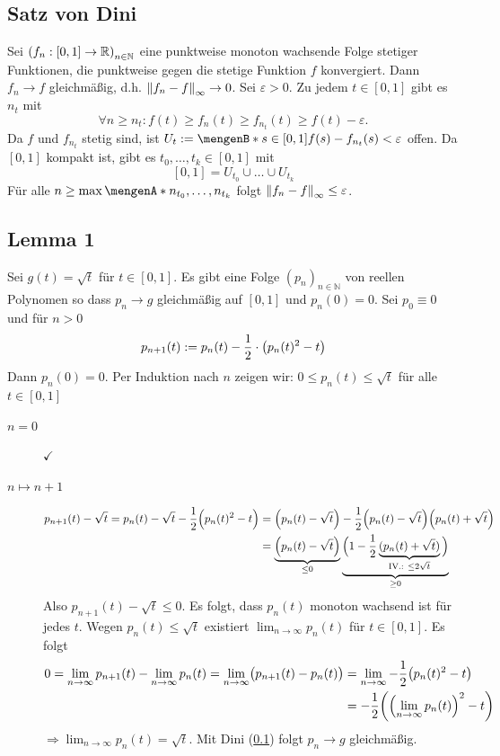 \subsection{Satz von Dini} %
\label{sub:64}
Sei $\enbrace*{f_n : [0,1] \to \mathds{R}}_{n \in \mathds{N}}$ eine punktweise monoton wachsende Folge stetiger Funktionen, die punktweise gegen die stetige Funktion $f$
konvergiert. Dann $f_n \to f$ gleichmäßig, d.h. $\norm[\infty]{f_n -f} \to 0 $.
Sei $\varepsilon >0$. Zu jedem $t \in [0,1]$ gibt es $n_t$ mit 
\[
	\forall n\ge n_t : f(t) \ge f_n(t) \ge f_{n_t}(t) \ge f(t) - \varepsilon. 
\]
Da $f$ und $f_{n_t}$ stetig sind,
ist $U_t := \set[{s \in [0,1]}]{f(s) - f_{n_t}(s) < \varepsilon} $ offen. Da $[0,1]$ kompakt ist, gibt es $t_0, \ldots , t_k \in [0,1]$ mit 
\[
	[0,1] = U_{t_0} \cup \ldots \cup U_{t_k}
\]
Für alle $n \ge \max \set{n_{t_0}, \ldots , n_{t_k}} $ folgt
\(
	\norm[\infty]{f_n - f} \le \varepsilon
\). \bewende 

\subsection[Lemma 1: Folge reeller Polynome, die gleichmäßig gegen Wurzelfunktion konvergiert]{Lemma 1} %
\label{sub:65}
Sei $g(t) = \sqrt{t}$ für $t \in [0,1]$. Es gibt eine Folge $(p_n)_{n \in \mathds{N}}$ von reellen Polynomen so dass $p_n \to g$ gleichmäßig auf $[0,1]$ und $p_n(0)=0$.
Sei $p_0 \equiv 0$ und für $n > 0$
\[
	p_{n+1} (t) := p_n(t) - \frac{1}{2} \cdot \enbrace[\big]{p_n(t)^2 - t} 
\]
Dann $p_n(0)=0$. Per Induktion nach $n$ zeigen wir: $0 \le p_n(t) \le \sqrt{t}$ für alle $t \in [0,1]$
\begin{description}
	\item[$n=0$] $\checkmark$ 
	\item[$n \mapsto n+1$] \begin{align*}
		p_{n+1}(t) - \sqrt{t} = p_n(t) - \sqrt{t} - \frac{1}{2} \enbrace[\Big]{p_n(t)^2 -t} &= \enbrace*{p_n(t) - \sqrt{t} }- \frac{1}{2} \enbrace*{p_n(t)- \sqrt{t}} 
		\enbrace*{p_n(t) + \sqrt{t}}        \\
		&=\underbrace{\enbrace*{p_n(t) - \sqrt{t}  } }_{\le 0} \underbrace{\Big( 1- \frac{1}{2}\underbrace{(p_n(t) + \sqrt{t}  )}_{\text{IV.: }\le 2 \sqrt{t}  } \Big)}_{\ge 0} 
	\end{align*}
	Also $p_{n+1}(t)- \sqrt{t} \le 0$. Es folgt, dass $p_n(t)$ monoton wachsend ist für jedes $t$. Wegen $p_n(t) \le \sqrt{t}$ existiert $\lim_{ n \to \infty} p_n(t)$
	für $t \in [0,1]$. Es folgt 
	\begin{align*}
		0 = \lim_{ n \to \infty} p_{n+1}(t) - \lim_{ n \to \infty} p_n(t) = \lim_{ n \to \infty} \enbrace[\big]{p_{n+1}(t) - p_n(t)} &= \lim_{ n \to \infty} 
		-\frac{1}{2} \enbrace[\big]{p_n(t)^2 -t  } \\
		&= - \frac{1}{2} \enbrace*{ \enbrace*{\lim_{ n \to \infty} p_n(t)}^2 -t }  
	\end{align*}
	$\Rightarrow \lim_{ n \to \infty} p_n(t) = \sqrt{t}$. Mit Dini (\ref{sub:64}) folgt $p_n \to g$ gleichmäßig. \bewende
\end{description}

